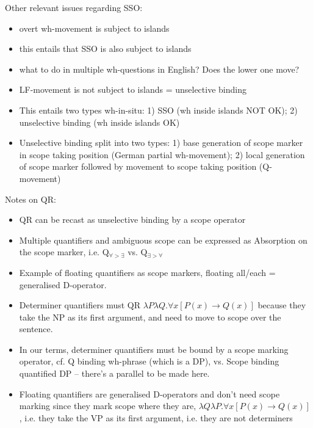 \documentclass[11pt]{article}
\begin{document}
Other relevant issues regarding SSO:
\begin{itemize}
	\item overt wh-movement is subject to islands
    \item this entails that SSO is also subject to islands
    \item what to do in multiple wh-questions in English? Does the lower one move?
    \item LF-movement is not subject to islands = unselective binding
    \item This entails two types wh-in-situ: 1) SSO (wh inside islands NOT OK); 2) unselective binding (wh inside islands OK)
    \item Unselective binding split into two types: 1) base generation of scope marker in scope taking position (German partial wh-movement); 2) local generation of scope marker followed by movement to scope taking position (Q-movement)
\end{itemize}

Notes on QR:
\begin{itemize}
	\item QR can be recast as unselective binding by a scope operator
    \item Multiple quantifiers and ambiguous scope can be expressed as Absorption on the scope marker, i.e. Q$_{\forall>\exists}$ vs. Q$_{\exists>\forall}$
    \item Example of floating quantifiers as scope markers, floating all/each = generalised D-operator.
    \item Determiner quantifiers must QR $\lambda P\lambda Q.\forall x[P(x) \to Q(x)]$ because they take the NP as its first argument, and need to move to scope over the sentence.
    \item In our terms, determiner quantifiers must be bound by a scope marking operator, cf. Q binding wh-phrase (which is a DP), vs. Scope binding quantified DP -- there's a parallel to be made here.
    \item Floating quantifiers are generalised D-operators and don't need scope marking since they mark scope where they are, $\lambda Q\lambda P.\forall x[P(x) \to Q(x)]$, i.e. they take the VP as its first argument, i.e. they are not determiners
\end{itemize}


%
\end{document}
